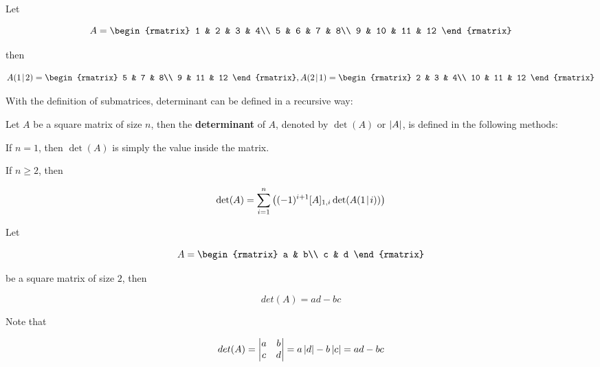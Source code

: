 \documentclass[a4paper,12pt]{article}
\begin{document}
\begin{exm}
  Let

  $$A=\begin{rmatrix}
    1 & 2 & 3 & 4\\
    5 & 6 & 7 & 8\\
    9 & 10 & 11 & 12
  \end{rmatrix}$$\s

  then

  $$A(1\!\mid\!2)=\begin{rmatrix}
    5 & 7 & 8\\
    9 & 11 & 12
  \end{rmatrix},A(2\!\mid\!1)=\begin{rmatrix}
    2 & 3 & 4\\
    10 & 11 & 12
  \end{rmatrix}$$
\end{exm}\n

With the definition of submatrices, determinant can be defined in a recursive way:\n

\begin{dft}
  Let $A$ be a square matrix of size $n$, then the \textbf{determinant} of $A$, denoted by $\det(A)$ or $\left| A\right|$, is defined in the following methods:

  \begin{alist}
    \item If $n=1$, then $\det(A)$ is simply the value inside the matrix.
    \item If $n\geq 2$, then
    
    $$\det(A)=\sum_{i=1}^{n}\left( (-1)^{i+1}[A]_{1,i}\det(A(1\!\mid\!i))\right)$$
  \end{alist}
\end{dft}\n

\begin{thm}
  Let

  $$A=\begin{rmatrix}
    a & b\\
    c & d
  \end{rmatrix}$$\s

  be a square matrix of size $2$, then
  
  $$det(A)=ad-bc$$\s

  \prf Note that

  $$det(A)=\left| \begin{matrix}
    a & b\\
    c & d
  \end{matrix}\right|=a\left| d\right|-b\left| c\right|=ad-bc$$
\end{thm}\n
\end{document}
